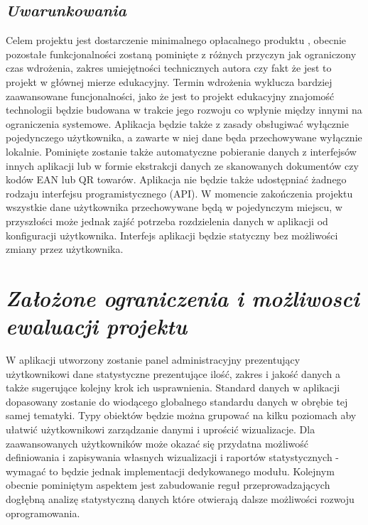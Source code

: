 \documentclass[a4paper,10pt]{report}
\newcommand{\customstylechapter}[1]{\large{\textit{#1}}}
\newcommand{\customstylesection}[1]{\textbf{\textit{#1}}}
\begin{document}
\section{\customstylesection{Uwarunkowania}}
{Celem projektu jest dostarczenie minimalnego opłacalnego produktu \cite{MVP}, 
obecnie pozostałe funkcjonalności zostaną pominięte z różnych przyczyn jak 
ograniczony czas wdrożenia, zakres umiejętności technicznych autora czy fakt że 
jest to projekt w głównej mierze edukacyjny. Termin wdrożenia wyklucza bardziej 
zaawansowane funcjonalności, jako że jest to projekt edukacyjny znajomość 
technologii będzie budowana w trakcie jego rozwoju co wpłynie między innymi na 
ograniczenia systemowe. Aplikacja będzie także z zasady obsługiwać wyłącznie 
pojedynczego użytkownika, a zawarte w niej dane będa  przechowywane wyłącznie 
lokalnie. Pominięte zostanie także automatyczne pobieranie danych z interfejsów 
innych aplikacji lub w formie ekstrakcji danych ze skanowanych dokumentów czy 
kodów EAN lub QR towarów. Aplikacja nie będzie także udostępniać żadnego rodzaju
 interfejsu programistycznego (API). W momencie zakończenia projektu wszystkie 
dane użytkownika przechowywane będą w pojedynczym miejscu, w przyszłości może 
jednak zajść potrzeba rozdzielenia danych w aplikacji od konfiguracji 
użytkownika. Interfejs aplikacji będzie statyczny bez możliwości zmiany przez 
użytkownika.}
%
\chapter{\customstylechapter{Założone ograniczenia i możliwosci ewaluacji projektu}}
{W aplikacji utworzony zostanie panel administracyjny prezentujący użytkownikowi 
dane statystyczne prezentujące ilość, zakres i jakość danych a także sugerujące 
kolejny krok ich usprawnienia. Standard danych w aplikacji dopasowany zostanie 
do wiodącego globalnego standardu danych w obrębie tej samej tematyki. Typy 
obiektów będzie można grupować na kilku poziomach aby ułatwić użytkownikowi 
zarządzanie danymi i uprościć wizualizacje. Dla zaawansowanych użytkowników 
może okazać się przydatna możliwość definiowania i zapisywania własnych 
wizualizacji i raportów statystycznych - wymagać to będzie jednak implementacji 
dedykowanego modułu. Kolejnym obecnie pominiętym aspektem jest zabudowanie reguł
 przeprowadzających dogłębną analizę statystyczną danych które otwierają dalsze 
możliwości rozwoju oprogramowania.}
\end{document}

